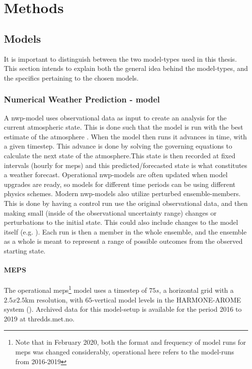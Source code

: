 \setcounter{chapter}{3}
\chapter{Methods}

\section{Models}\label{sec:models}

It is important to distinguish between the two model-types used in this thesis. This section intends to explain both the general idea behind the model-types, and the specifics pertaining to the chosen models.

\subsection{Numerical Weather Prediction - model}\label{sec:nwp}

A \acrfull{nwp}-model uses observational data as input to create an analysis for the current atmospheric state. This is done such that the model is run with the best estimate of the atmosphere . When the model then runs it advances in time, with a given timestep. This advance is done by solving the governing equations to calculate the next state of the atmosphere.This state is then recorded at fixed intervals (hourly for \acrshort{meps}) and this predicted/forecasted state is what constitutes a weather forecast. Operational \acrshort{nwp}-models are often updated when model upgrades are ready, so models for different time periods can be using different physics schemes. Modern \acrshort{nwp}-models also utilize perturbed ensemble-members. This is done by having a control run use the original observational data, and then making small (inside of the observational uncertainty range) changes or perturbations to the initial state. This could also include changes to the model itself (e.g. \cite{toth1993}). Each run is then a member in the whole ensemble, and the ensemble as a whole is meant to represent a range of possible outcomes from the observed starting state.

\subsubsection{MEPS}\label{sec:meps}
The operational \acrfull{meps}\footnote{Note that in February 2020, both the format and frequency of model runs for \acrfull{meps} was changed considerably, operational here refers to the model-runs from 2016-2019} model uses a timestep of $75s$, a horizontal grid with a $2.5x2.5$km  resolution, with $65$-vertical model levels in the HARMONE-AROME system (\cite{bengtsson2017}). Archived data for this model-setup is available for the period 2016 to 2019 at thredds.met.no.

